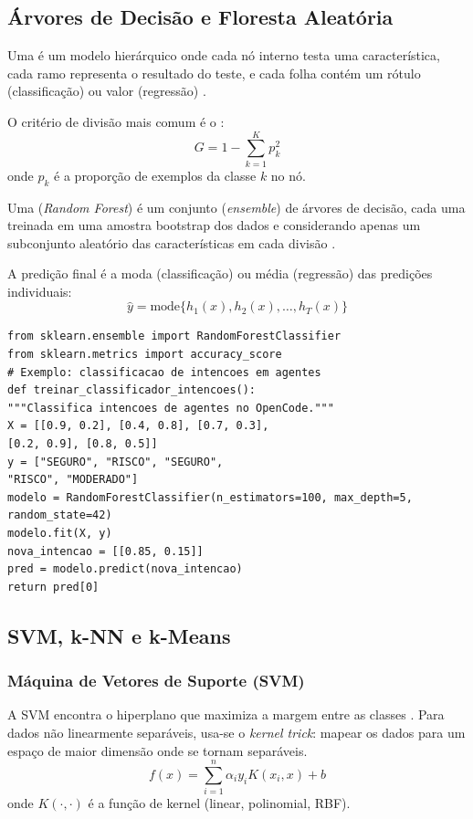 \subsection{Árvores de Decisão e Floresta Aleatória}
\begin{definicao}
Uma  é um modelo hierárquico onde cada nó
interno testa uma característica, cada ramo representa o resultado do
teste, e cada folha contém um rótulo (classificação) ou valor (regressão)
\cite{quinlan1986induction}.
\end{definicao}
O critério de divisão mais comum é o :
\[G = 1 - \sum_{k=1}^K p_k^2
\]
onde $p_k$ é a proporção de exemplos da classe $k$ no nó.
\begin{definicao}
Uma  (\textit{Random Forest}) é um conjunto
(\textit{ensemble}) de árvores de decisão, cada uma treinada em uma amostra
bootstrap dos dados e considerando apenas um subconjunto aleatório das
características em cada divisão \cite{breiman2001random}.
\end{definicao}
A predição final é a moda (classificação) ou média (regressão) das
predições individuais:
\[\hat{y} = \text{mode}\{h_1(x), h_2(x), \ldots, h_T(x)\}
\]
\begin{lstlisting}[style=pythonstyle]
from sklearn.ensemble import RandomForestClassifier
from sklearn.metrics import accuracy_score
# Exemplo: classificacao de intencoes em agentes
def treinar_classificador_intencoes():
"""Classifica intencoes de agentes no OpenCode."""
X = [[0.9, 0.2], [0.4, 0.8], [0.7, 0.3],
[0.2, 0.9], [0.8, 0.5]]
y = ["SEGURO", "RISCO", "SEGURO",
"RISCO", "MODERADO"]
modelo = RandomForestClassifier(n_estimators=100, max_depth=5,
random_state=42)
modelo.fit(X, y)
nova_intencao = [[0.85, 0.15]]
pred = modelo.predict(nova_intencao)
return pred[0]
\end{lstlisting}
\subsection{SVM, k-NN e k-Means}
\subsubsection{Máquina de Vetores de Suporte (SVM)}
A SVM encontra o hiperplano que maximiza a margem entre as classes
\cite{cortes1995support}. Para dados não linearmente separáveis, usa-se o
\textit{kernel trick}: mapear os dados para um espaço de maior dimensão onde
se tornam separáveis.
\[f(x) = \sum_{i=1}^n \alpha_i y_i K(x_i, x) + b
\]
onde $K(\cdot, \cdot)$ é a função de kernel (linear, polinomial, RBF).

